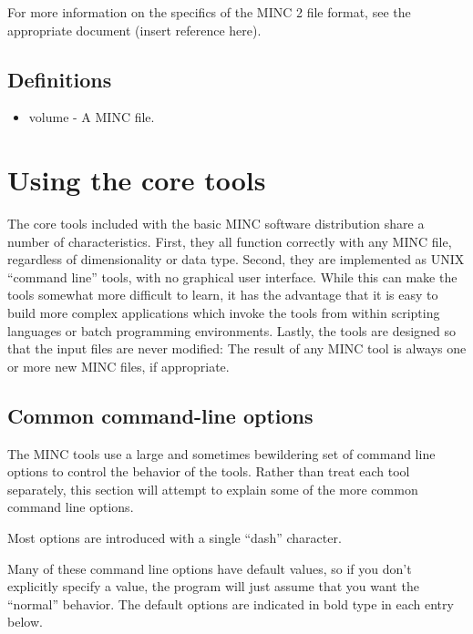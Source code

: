 \documentclass{article}
\begin{document}
For more information on the specifics of the MINC 2 file format, see the
appropriate document (insert reference here).

\subsection{Definitions}
\begin{itemize}
\item volume - A MINC file.  
\end{itemize}
\newpage
\section{Using the core tools}
The core tools included with the basic MINC software distribution
share a number of characteristics.  First, they all function correctly
with any MINC file, regardless of dimensionality or data type.
Second, they are implemented as UNIX ``command line'' tools, with no
graphical user interface.  While this can make the tools somewhat more
difficult to learn, it has the advantage that it is easy to build more
complex applications which invoke the tools from within scripting
languages or batch programming environments.  Lastly, the tools are
designed so that the input files are never modified: The result of any
MINC tool is always one or more new MINC files, if appropriate.

\subsection{Common command-line options}
The MINC tools use a large and sometimes bewildering set of command line
options to control the behavior of the tools.  Rather than treat
each tool separately, this section will attempt to explain some of the 
more common command line options.

Most options are introduced with a single ``dash'' character.

Many of these command line options have default values, so if you 
don't explicitly specify a value, the program will just assume that
you want the ``normal'' behavior.  The default options are indicated
in bold type in each entry below.
\end{document}

